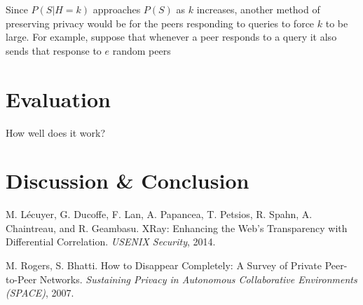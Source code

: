\documentclass{article}
\begin{document}
Since $P(S|H=k)$ approaches $P(S)$ as $k$ increases, another method of
preserving privacy would be for the peers responding to queries to force $k$ to
be large. For example, suppose that whenever a peer responds to a query it also
sends that response to $e$ random peers

\section{Evaluation}

How well does it work?

\section{Discussion \& Conclusion}

\begin{thebibliography}{9}

	M. L\'ecuyer, G. Ducoffe, F. Lan, A. Papancea, T. Petsios, R. Spahn, A. Chaintreau, and R. Geambasu.
	XRay: Enhancing the Web’s Transparency with Differential Correlation.
	\emph{USENIX Security}, 2014.

	M. Rogers, S. Bhatti.
	How to Disappear Completely: A Survey of Private Peer-to-Peer Networks.
	\emph{Sustaining Privacy in Autonomous Collaborative Environments (SPACE)}, 2007.

\end{thebibliography}
\end{document}

